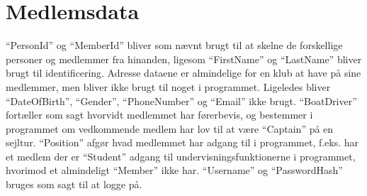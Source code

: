 \section{Medlemsdata}

``PersonId'' og ``MemberId'' bliver som nævnt brugt til at skelne de forskellige personer og medlemmer fra hinanden,
ligesom ``FirstName'' og ``LastName'' bliver brugt til identificering. Adresse dataene er almindelige for en klub at
have på sine medlemmer, men bliver ikke brugt til noget i programmet. Ligeledes bliver ``DateOfBirth'', ``Gender'',
``PhoneNumber'' og ``Email'' ikke brugt. ``BoatDriver'' fortæller som sagt hvorvidt medlemmet har førerbevis, og
bestemmer i programmet om vedkommende medlem har lov til at være ``Captain'' på en sejltur. ``Position'' afgør hvad
medlemmet har adgang til i programmet, f.eks. har et medlem der er ``Student'' adgang til undervisningsfunktionerne i
programmet, hvorimod et almindeligt ``Member'' ikke har. ``Username'' og ``PasswordHash'' bruges som sagt til at logge
på.